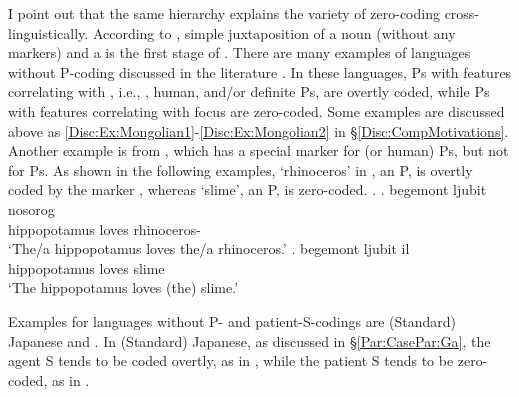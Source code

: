 I point out that the same hierarchy \Last explains the variety of zero-coding cross-linguistically.
According to ,
simple juxtaposition of a noun (without any markers) and a  is the first stage of .
There are many examples of languages without P-coding discussed in the literature
\cite[]{comrie79,comrie83,croft03,aissen03,haspelmath08}.
In these languages,
Ps with features correlating with ,
i.e.,  , human, and/or definite Ps,
are overtly coded,
while Ps with features correlating with focus
are zero-coded.
Some examples are discussed above as \ref{Disc:Ex:Mongolian1}-\ref{Disc:Ex:Mongolian2} in \S \ref{Disc:CompMotivations}.
Another example is from ,
which has a special marker for  (or human) Ps,
but not for  Ps.
As shown in the following examples,
 `rhinoceros' in \Next[a], an  P,
is overtly coded by the  marker ,
whereas  `slime', an  P,
is zero-coded.
%
\ex.
 \ag. begemont ljubit nosorog \\
      hippopotamus loves rhinoceros- \\
      `The/a hippopotamus loves the/a rhinoceros.'
 \bg. begemont ljubit il \\
      hippopotamus loves slime \\
      `The hippopotamus loves (the) slime.'

Examples for languages without P- and patient-S-codings are (Standard) Japanese and .
In (Standard) Japanese,
as discussed in \S \ref{Par:CasePar:Ga},
the agent S tends to be coded overtly, as in \Next[a],
while the patient S tends to be zero-coded, as in \Next[b-c]
\cite[93]{kageyama93}.

